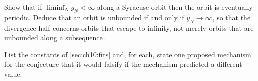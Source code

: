 \begin{exercise}
Show that if $\liminf_N y_N<\infty$ along a Syracuse orbit then the orbit is
eventually periodic. Deduce that an orbit is unbounded if and only if
$y_N\to\infty$, so that the divergence half concerns orbits that escape to
infinity, not merely orbits that are unbounded along a subsequence.
\end{exercise}

\begin{exercise}
List the constants of \cref{sec:ch10:fits} and, for each, state one proposed
mechanism for the conjecture that it would falsify if the mechanism predicted a
different value.
\end{exercise}
